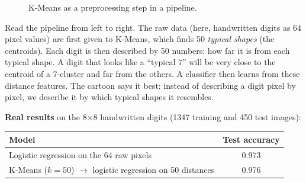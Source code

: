 \begin{figure}[!htbp]
\centering
{}
\caption{K-Means as a preprocessing step in a pipeline.}\label{fig:prepipe}
\end{figure}

\begin{explain}
Read the pipeline from left to right. The raw data (here, handwritten digits as 64 pixel values) are first given to K-Means, which finds 50 \emph{typical shapes} (the centroids). Each digit is then described by 50 numbers: how far it is from each typical shape. A digit that looks like a ``typical 7'' will be very close to the centroid of a 7-cluster and far from the others. A classifier then learns from these distance features. The cartoon says it best: instead of describing a digit pixel by pixel, we describe it by which typical shapes it resembles.
\end{explain}

\textbf{Real results} on the 8$\times$8 handwritten digits (1347 training and 450 test images):

\begin{center}
\begin{tabular}{@{}lc@{}}
\toprule
\textbf{Model} & \textbf{Test accuracy}\\
\midrule
Logistic regression on the 64 raw pixels & 0.973\\
K-Means ($k=50$) $\rightarrow$ logistic regression on 50 distances & 0.976\\
\bottomrule
\end{tabular}
\end{center}

